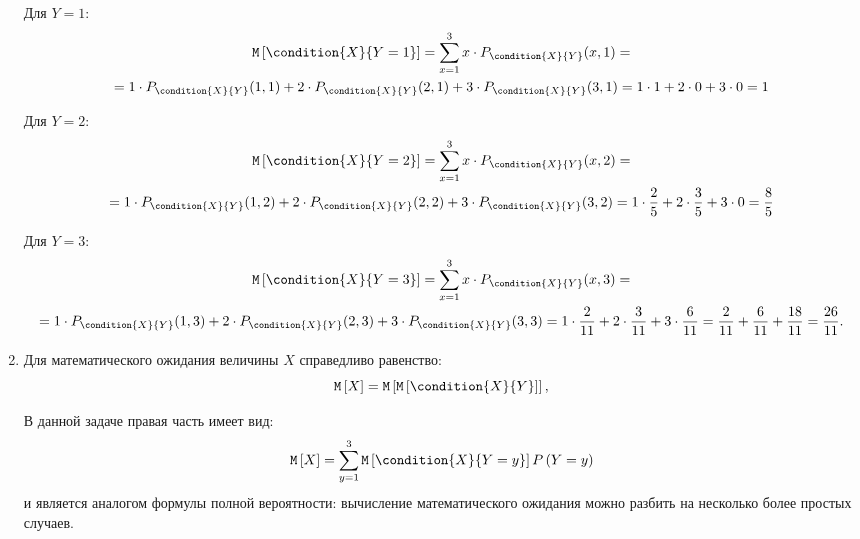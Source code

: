 \documentclass[12pt,a4paper]{article}
\begin{document}
\begin{enumerate}
        Для $Y=1$:
        \begin{multline}
            \expectation{\condition{X}{Y=1}}
            = \sum_{x=1}^3 x \cdot P_{\condition{X}{Y}}(x, 1) = \\
            = 1 \cdot P_{\condition{X}{Y}}(1, 1) + 2 \cdot P_{\condition{X}{Y}}(2, 1) + 3 \cdot P_{\condition{X}{Y}}(3, 1)
            = 1 \cdot 1 + 2 \cdot 0 + 3 \cdot 0
            = 1
        \end{multline}

        Для $Y=2$:
        \begin{multline}
            \expectation{\condition{X}{Y=2}}
            = \sum_{x=1}^3 x \cdot P_{\condition{X}{Y}}(x, 2) = \\
            = 1 \cdot P_{\condition{X}{Y}}(1, 2) + 2 \cdot P_{\condition{X}{Y}}(2, 2) + 3 \cdot P_{\condition{X}{Y}}(3, 2)
            = 1 \cdot \frac{2}{5} + 2 \cdot \frac{3}{5} + 3 \cdot 0
            = \frac{8}{5}
        \end{multline}

        Для $Y=3$:
        \begin{multline}
            \expectation{\condition{X}{Y=3}}
            = \sum_{x=1}^3 x \cdot P_{\condition{X}{Y}}(x, 3) = \\
            = 1 \cdot P_{\condition{X}{Y}}(1, 3) + 2 \cdot P_{\condition{X}{Y}}(2, 3) + 3 \cdot P_{\condition{X}{Y}}(3, 3)
            = 1 \cdot \frac{2}{11} + 2 \cdot \frac{3}{11} + 3 \cdot \frac{6}{11}
            = \frac{2}{11} + \frac{6}{11} + \frac{18}{11}
            = \frac{26}{11} .
        \end{multline}

        \item Для математического ожидания величины $X$ справедливо равенство:
        \begin{equation}
            \expectation{X} = \expectation{\expectation{\condition{X}{Y}}} ,
        \end{equation}

        В данной задаче правая часть имеет вид:
        \begin{equation}
            \expectation{X} = \sum_{y=1}^3 \expectation{\condition{X}{Y=y}} \probability{Y=y}
        \end{equation}
        и является аналогом формулы полной вероятности: вычисление математического ожидания можно разбить на несколько более простых случаев.


\end{enumerate}
\end{document}
